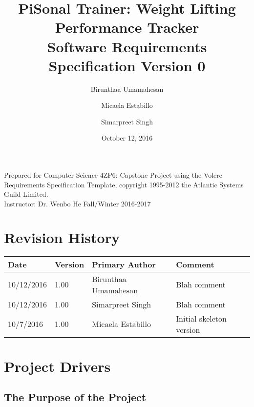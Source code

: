 \documentclass{article}
\title{
PiSonal Trainer: Weight Lifting Performance Tracker\\
\Large {Software Requirements Specification Version 0}
}
\date{October 12, 2016}
\author{Birunthaa Umamahesan \and Micaela Estabillo \and Simarpreet Singh}
\begin{document}
\thispagestyle{plain}
\maketitle
\vfill
\begin{center}
    Prepared for Computer Science 4ZP6: Capstone Project using the Volere Requirements Specification Template, copyright 1995-2012 the Atlantic Systems Guild Limited. \\
    Instructor: Dr. Wenbo He
    Fall/Winter 2016-2017
\end{center}
\newpage

\tableofcontents

\listoffigures

\listoftables

\thispagestyle{plain}

\newpage

\section*{Revision History}
\begin{tabular}{ | p{2cm} | p{1.5cm} | p{3.8cm} | p{7cm} |} 
    \hline
    \textbf{Date} & \textbf{Version} & \textbf{Primary Author} & \textbf{Comment}\\
    \hline
    10/12/2016 & 1.00 & Birunthaa Umamahesan & Blah comment\\
    \hline
    10/12/2016 & 1.00 & Simarpreet Singh & Blah comment\\ 
    \hline
    10/7/2016 & 1.00 & Micaela Estabillo & Initial skeleton version\\
    \hline
\end{tabular}
\newpage

\clearpage
\setcounter{page}{1}

\section{Project Drivers}
\subsection{The Purpose of the Project}
\end{document}
